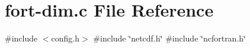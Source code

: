 \hypertarget{fort-dim_8c}{}\section{fort-\/dim.c File Reference}
\label{fort-dim_8c}
{\ttfamily \#include $<$config.\+h$>$}\newline
{\ttfamily \#include \char`\"{}netcdf.\+h\char`\"{}}\newline
{\ttfamily \#include \char`\"{}ncfortran.\+h\char`\"{}}\newline
